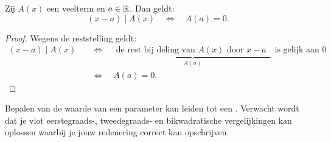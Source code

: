 \documentclass{ximera}
\begin{document}
\begin{stelling}\label{stelling:kenmerkvandeelbaarheid}
Zij $A(x)$ een veelterm en $a \in \mathbb{R}$. Dan geldt:
\[
(x-a) \mid A(x) \quad \Leftrightarrow \quad A(a) = 0.
\]
\end{stelling}
\begin{proof}
Wegens de reststelling geldt:
\begin{align}
(x-a) \mid A(x) \quad 
& \Leftrightarrow \quad \underbrace{\text{ de rest bij deling van $A(x)$ door $x-a$ }}_{A(a)} \text{ is gelijk aan $0$} \nonumber \\
& \Leftrightarrow \quad A(a) = 0. \tag*{\qedhere}
\end{align}
\end{proof}

Bepalen van de waarde van een parameter kan leiden tot een . Verwacht wordt dat je vlot eerstegraads-, tweedegraads- en bikwadratische vergelijkingen kan oplossen waarbij je jouw redenering correct kan opschrijven. 
\end{document}
